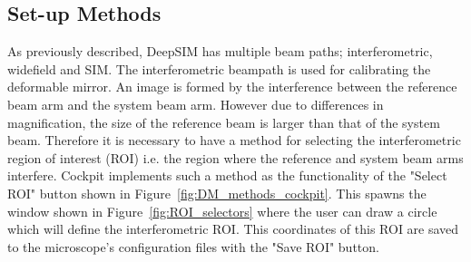 \subsection{Set-up Methods}
\label{subsec:set_up_methods}

As previously described, DeepSIM has multiple beam paths; interferometric, widefield and SIM. The interferometric beampath is used for calibrating the deformable mirror. An image is formed by the interference between the reference beam arm and the system beam arm. However due to differences in magnification, the size of the reference beam is larger than that of the system beam. Therefore it is necessary to have a method for selecting the interferometric region of interest (ROI) i.e. the region where the reference and system beam arms interfere. Cockpit implements such a method as the functionality of the "Select ROI" button shown in Figure~\ref{fig:DM_methods_cockpit}. This spawns the window shown in Figure~\ref{fig:ROI_selectors} where the user can draw a circle which will define the interferometric ROI. This coordinates of this ROI are saved to the microscope's configuration files with the "Save ROI" button.

